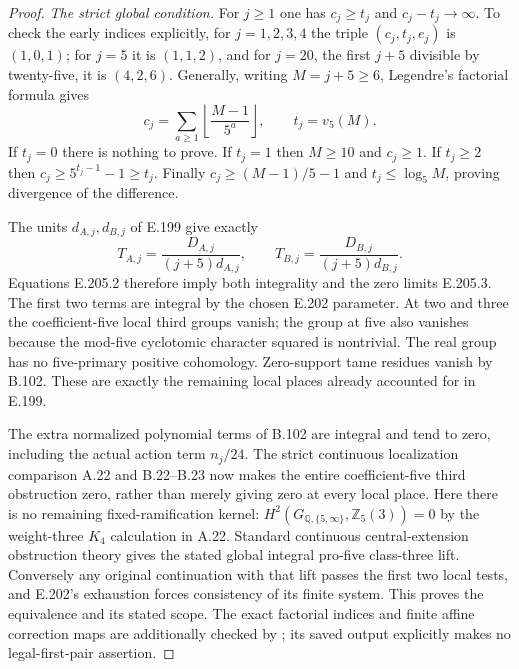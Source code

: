\begin{proof}
\emph{The strict global condition.}
For $j\geq1$ one has $c_j\geq t_j$ and
$c_j-t_j\longrightarrow\infty$.  To check the early
indices explicitly, for $j=1,2,3,4$ the triple
$(c_j,t_j,e_j)$ is $(1,0,1)$; for $j=5$ it is
$(1,1,2)$, and for $j=20$, the first $j+5$ divisible
by twenty-five, it is $(4,2,6)$.  Generally, writing
$M=j+5\geq6$, Legendre's factorial formula gives
\[
 c_j=\sum_{a\geq1}\left\lfloor\frac{M-1}{5^a}\right\rfloor,
 \qquad t_j=v_5(M).
\]
If $t_j=0$ there is nothing to prove.  If $t_j=1$
then $M\geq10$ and $c_j\geq1$.  If $t_j\geq2$
then $c_j\geq5^{t_j-1}-1\geq t_j$.
Finally $c_j\geq(M-1)/5-1$ and
$t_j\leq\log_5M$, proving divergence of the difference.

The units $d_{A,j},d_{B,j}$ of E.199 give exactly
\[
 T_{A,j}=\frac{D_{A,j}}{(j+5)d_{A,j}},\qquad
 T_{B,j}=\frac{D_{B,j}}{(j+5)d_{B,j}}.
\]
Equations E.205.2 therefore imply both integrality and
the zero limits E.205.3.  The first two terms are integral
by the chosen E.202 parameter.  At two and three the
coefficient-five local third groups vanish; the group
at five also vanishes because the mod-five cyclotomic
character squared is nontrivial.  The real group has
no five-primary positive cohomology.  Zero-support tame
residues vanish by B.102.  These are exactly the remaining
local places already accounted for in E.199.

The extra normalized polynomial terms of B.102 are
integral and tend to zero, including the actual action
term $n_j/24$.  The strict continuous localization
comparison A.22 and B.22--B.23 now makes the entire
coefficient-five third obstruction zero, rather than
merely giving zero at every local place.  Here there is
no remaining fixed-ramification kernel:
$H^2(G_{\mathbb Q,\{5,\infty\}},\mathbb Z_5(3))=0$
by the weight-three $K_4$ calculation in A.22.
Standard
continuous central-extension obstruction theory gives
the stated global integral pro-five class-three lift.
Conversely any original continuation with that lift
passes the first two local tests, and E.202's exhaustion
forces consistency of its finite system.  This proves
the equivalence and its stated scope.
The exact factorial indices and finite affine correction
maps are additionally checked by
; its saved
output explicitly makes no legal-first-pair assertion.
\end{proof}
